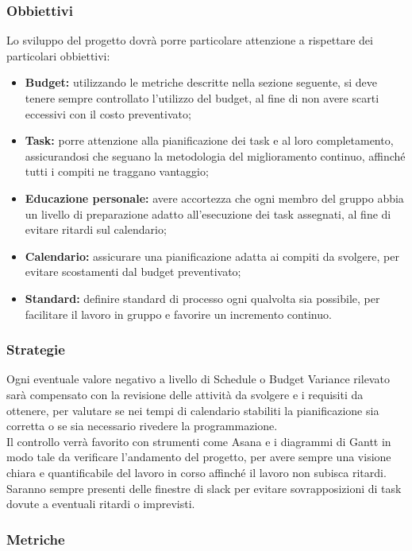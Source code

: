 \documentclass[PianoDiQualifica.tex]{subfiles}
\begin{document}
\subsubsection{Obbiettivi}
Lo sviluppo del progetto dovrà porre particolare attenzione a rispettare dei particolari obbiettivi:
\begin{itemize}
	\item \textbf{Budget:} utilizzando le metriche descritte nella sezione seguente, si deve tenere sempre controllato l'utilizzo del budget, al fine di non avere scarti eccessivi con il costo preventivato;
	\item \textbf{Task:} porre attenzione alla pianificazione dei task e al loro completamento, assicurandosi che seguano la metodologia del miglioramento continuo, affinché tutti i compiti ne traggano vantaggio;
	\item \textbf{Educazione personale:} avere accortezza che ogni membro del gruppo abbia un livello di preparazione adatto all'esecuzione dei task assegnati, al fine di evitare ritardi sul calendario;
	\item \textbf{Calendario:} assicurare una pianificazione adatta ai compiti da svolgere, per evitare scostamenti dal budget preventivato;
	\item \textbf{Standard:} definire standard di processo ogni qualvolta sia possibile, per facilitare il lavoro in gruppo e favorire un incremento continuo.
\end{itemize}

\subsubsection{Strategie}
Ogni eventuale valore negativo a livello di Schedule o Budget Variance rilevato sarà compensato con la revisione delle attività da svolgere e i requisiti da ottenere, per valutare se nei tempi di calendario stabiliti la pianificazione sia corretta o se sia necessario rivedere la programmazione.\\
Il controllo verrà favorito con strumenti come Asana e i diagrammi di Gantt in modo tale da verificare l'andamento del progetto, per avere sempre una visione chiara e quantificabile del lavoro in corso affinché il lavoro non subisca ritardi.\\
Saranno sempre presenti delle finestre di slack per evitare sovrapposizioni di task dovute a eventuali ritardi o imprevisti. 

\subsubsection{Metriche} 
\end{document}
